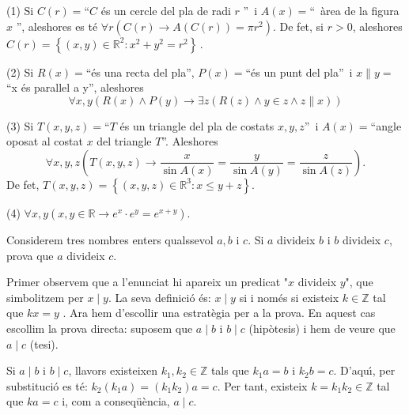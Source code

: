 \begin{solucio}
(1) Si $C(r)=$\textquotedblleft$C$ \'{e}s un cercle del pla de radi $r$%
\textquotedblright\ i $A(x)=$\textquotedblleft\ \`{a}rea de la figura $x$%
\textquotedblright, aleshores es t\'{e} $\forall r\left( C(r)\longrightarrow
A(C(r))=\pi r^{2}\right) $. De fet, si $r>0$, aleshores $C(r)=\left\{ \left(
x,y\right) \in\mathbb{R}^{2}:x^{2}+y^{2}=r^{2}\right\} \,$.

(2) Si $R(x)=$\textquotedblleft\'{e}s una recta del pla\textquotedblright, $%
P(x)=$\textquotedblleft\'{e}s un punt del pla\textquotedblright\ i $%
x\parallel y=$\textquotedblleft x \'{e}s paral\textperiodcentered lel a
y\textquotedblright, aleshores%
\begin{equation*}
\forall x,y\left( R(x)\wedge P(y)\longrightarrow\exists z\left( R(z)\wedge
y\in z\wedge z\parallel x\right) \right)
\end{equation*}

(3) Si $T(x,y,z)=$\textquotedblleft$T$ \'{e}s un triangle del pla de costats
$x,y,z$\textquotedblright\ i $A(x)=$\textquotedblleft angle oposat al costat
$x$ del triangle $T$\textquotedblright. Aleshores%
\begin{equation*}
\forall x,y,z\left( T(x,y,z)\longrightarrow\frac{x}{\sin A(x)}=\frac{y}{\sin
A(y)}=\frac{z}{\sin A(z)}\right) \text{.}
\end{equation*}
De fet, $T(x,y,z)=\left\{ (x,y,z)\in\mathbb{R}^{3}:x\leq y+z\right\} $.

(4) $\forall x,y\left( x,y\in\mathbb{R}\longrightarrow e^{x}\cdot
e^{y}=e^{x+y}\right) $.
\end{solucio}

\begin{exemple}
Considerem tres nombres enters qualssevol $a,b$ i $c$. Si $a$ divideix $b$ i
$b$ divideix $c$, prova que $a$ divideix $c$.
\end{exemple}

\begin{solucio}
Primer observem que a l'enunciat hi apareix un predicat "$x$ divideix $y$",
que simbolitzem per $x\mid y$. La seva definici\'{o} \'{e}s: $x\mid y$ si i nom\'{e}s si existeix $k\in\mathbb{Z}$ tal que $kx=y$%
. Ara hem d'escollir una estrat\`{e}gia per a la prova. En aquest cas escollim la
prova directa: suposem que $a\mid b$ i $b\mid c$ (hip\`{o}tesis) i hem de
veure que $a\mid c$ (tesi).

Si $a\mid b$ i $b\mid c$, llavors existeixen $k_{1},k_{2}\in\mathbb{Z}$ tals
que $k_{1}a=b$ i $k_{2}b=c$. D'aqu\'{\i}, per substituci\'{o} es t\'{e}: $%
k_{2}\left( k_{1}a\right) =\left( k_{1}k_{2}\right) a=c$. Per tant, existeix
$k=k_{1}k_{2}\in\mathbb{Z}$ tal que $ka=c$ i, com a conseq\"{u}\`{e}ncia, $%
a\mid c$.
\end{solucio}

